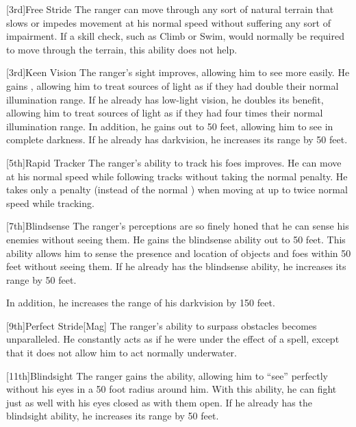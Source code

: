         [3rd]{Free Stride}
        The ranger can move through any sort of natural terrain that slows or impedes movement at his normal speed without suffering any sort of impairment.
        If a skill check, such as Climb or Swim, would normally be required to move through the terrain, this ability does not help.

        [3rd]{Keen Vision}
        The ranger's sight improves, allowing him to see more easily.
        He gains , allowing him to treat sources of light as if they had double their normal illumination range.
        If he already has low-light vision, he doubles its benefit, allowing him to treat sources of light as if they had four times their normal illumination range.
        In addition, he gains  out to 50 feet, allowing him to see in complete darkness.
        If he already has darkvision, he increases its range by 50 feet.

        [5th]{Rapid Tracker}
        The ranger's ability to track his foes improves.
        He can move at his normal speed while following tracks without taking the normal  penalty.
        He takes only a  penalty (instead of the normal ) when moving at up to twice normal speed while tracking.

        [7th]{Blindsense}
        The ranger's perceptions are so finely honed that he can sense his enemies without seeing them.
        He gains the blindsense ability out to 50 feet.
        This ability allows him to sense the presence and location of objects and foes within 50 feet without seeing them.
        If he already has the blindsense ability, he increases its range by 50 feet.

        In addition, he increases the range of his darkvision by 150 feet.

        [9th]{Perfect Stride}[Mag]
        The ranger's ability to surpass obstacles becomes unparalleled.
        He constantly acts as if he were under the effect of a  spell, except that it does not allow him to act normally underwater.

        [11th]{Blindsight}
        The ranger gains the  ability, allowing him to ``see'' perfectly without his eyes in a 50 foot radius around him.
        With this ability, he can fight just as well with his eyes closed as with them open.
        If he already has the blindsight ability, he increases its range by 50 feet.

